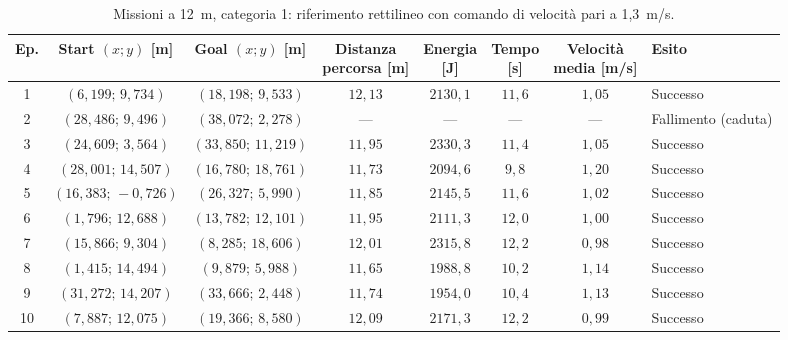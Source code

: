 \begin{table}[H]
\centering
\caption{Missioni a 12~m, categoria 1: riferimento rettilineo con comando di velocità pari a 1,3~m/s.}
\label{tab:straight-line-1-3-12m-cat1}
\begingroup
\fontsize{9}{11}\selectfont
\setlength{\tabcolsep}{2.5pt}
\renewcommand{\arraystretch}{1.2}
\begin{tabular}{@{}c cc cccc l@{}}
\toprule
Ep. & \shortstack{Start $(x;y)$\\{}[m]} & \shortstack{Goal $(x;y)$\\{}[m]} & \shortstack{Distanza\\percorsa [m]} & \shortstack{Energia\\{}[J]} & \shortstack{Tempo\\{}[s]} & \shortstack{Velocità\\media [m/s]} & Esito \\
\midrule
1 & $(6{,}199;\,9{,}734)$ & $(18{,}198;\,9{,}533)$ & $12{,}13$ & $2130{,}1$ & $11{,}6$ & $1{,}05$ & Successo \\
2 & $(28{,}486;\,9{,}496)$ & $(38{,}072;\,2{,}278)$ & --- & --- & --- & --- & Fallimento (caduta) \\
3 & $(24{,}609;\,3{,}564)$ & $(33{,}850;\,11{,}219)$ & $11{,}95$ & $2330{,}3$ & $11{,}4$ & $1{,}05$ & Successo \\
4 & $(28{,}001;\,14{,}507)$ & $(16{,}780;\,18{,}761)$ & $11{,}73$ & $2094{,}6$ & $9{,}8$ & $1{,}20$ & Successo \\
5 & $(16{,}383;\,-0{,}726)$ & $(26{,}327;\,5{,}990)$ & $11{,}85$ & $2145{,}5$ & $11{,}6$ & $1{,}02$ & Successo \\
6 & $(1{,}796;\,12{,}688)$ & $(13{,}782;\,12{,}101)$ & $11{,}95$ & $2111{,}3$ & $12{,}0$ & $1{,}00$ & Successo \\
7 & $(15{,}866;\,9{,}304)$ & $(8{,}285;\,18{,}606)$ & $12{,}01$ & $2315{,}8$ & $12{,}2$ & $0{,}98$ & Successo \\
8 & $(1{,}415;\,14{,}494)$ & $(9{,}879;\,5{,}988)$ & $11{,}65$ & $1988{,}8$ & $10{,}2$ & $1{,}14$ & Successo \\
9 & $(31{,}272;\,14{,}207)$ & $(33{,}666;\,2{,}448)$ & $11{,}74$ & $1954{,}0$ & $10{,}4$ & $1{,}13$ & Successo \\
10 & $(7{,}887;\,12{,}075)$ & $(19{,}366;\,8{,}580)$ & $12{,}09$ & $2171{,}3$ & $12{,}2$ & $0{,}99$ & Successo \\
\bottomrule
\end{tabular}
\endgroup
\end{table}

